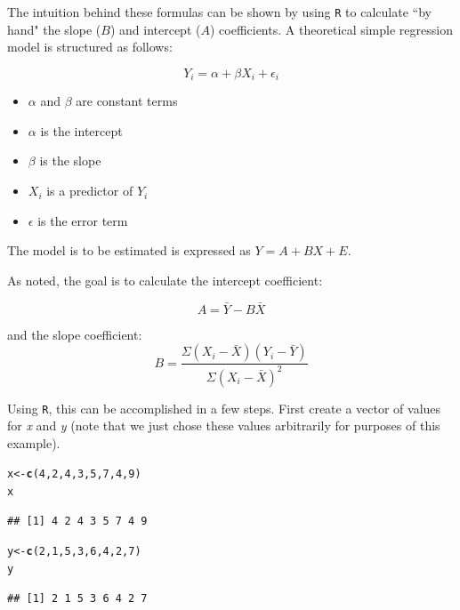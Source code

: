 \documentclass[11pt,openany]{book}\usepackage[]{graphicx}\usepackage[]{color}
\makeatletter
\newcommand{\hlnum}[1]{\textcolor[rgb]{0.686,0.059,0.569}{#1}}%
\newcommand{\hlstd}[1]{\textcolor[rgb]{0.345,0.345,0.345}{#1}}%
\newcommand{\hlkwb}[1]{\textcolor[rgb]{0.69,0.353,0.396}{#1}}%
\newcommand{\hlkwd}[1]{\textcolor[rgb]{0.737,0.353,0.396}{\textbf{#1}}}%
\newenvironment{kframe}{%
 \def\at@end@of@kframe{}%
 \ifinner\ifhmode%
  \def\at@end@of@kframe{\end{minipage}}%
  \begin{minipage}{\columnwidth}%
 \fi\fi%
 \def\FrameCommand##1{\hskip\@totalleftmargin \hskip-\fboxsep
 \colorbox{shadecolor}{##1}\hskip-\fboxsep
     \hskip-\linewidth \hskip-\@totalleftmargin \hskip\columnwidth}%
 \MakeFramed {\advance\hsize-\width
   \@totalleftmargin\z@ \linewidth\hsize
   \@setminipage}}%
 {\par\unskip\endMakeFramed%
 \at@end@of@kframe}
\newenvironment{knitrout}{}{} %
\renewenvironment{knitrout}{\begin{singlespace}}{\end{singlespace}}
\makeatother
\begin{document}
The intuition behind these formulas can be shown by using \texttt{R} to calculate ``by hand" the slope ($B$) and intercept ($A$) coefficients. A theoretical simple regression model is structured as
follows:  

\begin{equation*}
Y_{i} = \alpha + \beta X_{i} + \epsilon_{i} 
\end{equation*}

\begin{itemize}
\item $\alpha$ and $\beta$ are constant terms
\item $\alpha$ is the intercept
\item $\beta$ is the slope
\item $X_{i}$ is a predictor of $Y_{i}$
\item $\epsilon$ is the error term
\end{itemize}

\noindent The model is to be estimated is expressed as $Y=A+BX+E$. 

\noindent As noted, the goal is to calculate the intercept coefficient: 

\begin{equation*}
A=\bar Y-B\bar X 
\end{equation*}

\noindent and the slope
coefficient: 
\begin{equation*}
B=\frac{\Sigma(X_{i}-\bar X)(Y_{i}-\bar Y)}{\Sigma(X_{i}-\bar X)^2}
\end{equation*}

Using \texttt{R}, this can be accomplished in a few steps. First create a vector of values for \textit{x} and \textit{y} (note that we just chose these values arbitrarily for purposes of this example). 

\begin{knitrout}
\color{fgcolor}\begin{kframe}
\begin{alltt}
\hlstd{x} \hlkwb{<-} \hlkwd{c}\hlstd{(}\hlnum{4}\hlstd{,} \hlnum{2}\hlstd{,} \hlnum{4}\hlstd{,} \hlnum{3}\hlstd{,} \hlnum{5}\hlstd{,} \hlnum{7}\hlstd{,} \hlnum{4}\hlstd{,} \hlnum{9}\hlstd{)}
\hlstd{x}
\end{alltt}
\begin{verbatim}
## [1] 4 2 4 3 5 7 4 9
\end{verbatim}
\begin{alltt}
\hlstd{y} \hlkwb{<-} \hlkwd{c}\hlstd{(}\hlnum{2}\hlstd{,} \hlnum{1}\hlstd{,} \hlnum{5}\hlstd{,} \hlnum{3}\hlstd{,} \hlnum{6}\hlstd{,} \hlnum{4}\hlstd{,} \hlnum{2}\hlstd{,} \hlnum{7}\hlstd{)}
\hlstd{y}
\end{alltt}
\begin{verbatim}
## [1] 2 1 5 3 6 4 2 7
\end{verbatim}
\end{kframe}
\end{knitrout}
\end{document}
